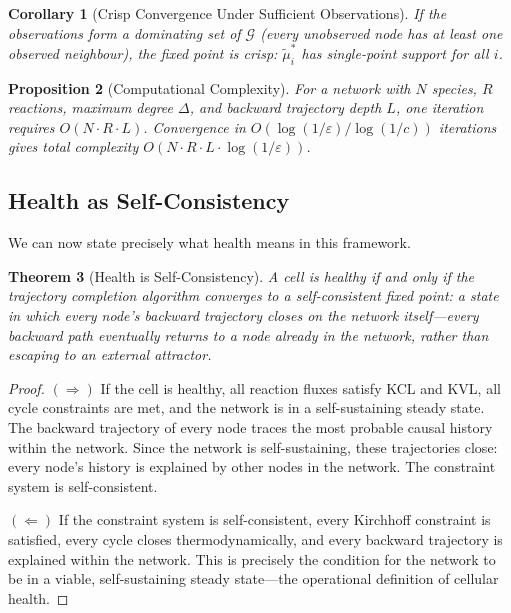 \documentclass[10pt,twocolumn,a4paper]{article}
\theoremstyle{plain}
\newtheorem{theorem}{Theorem}[section]
\newtheorem{proposition}[theorem]{Proposition}
\newtheorem{corollary}[theorem]{Corollary}
\theoremstyle{definition}
\theoremstyle{remark}
\newcommand{\circuit}{\mathcal{G}}
\begin{document}
\begin{corollary}[Crisp Convergence Under Sufficient Observations]
\label{cor:crisp}
If the observations form a dominating set of $\circuit$ (every unobserved node has at least one observed neighbour), the fixed point is crisp: $\widetilde{\mu}_i^*$ has single-point support for all $i$.
\end{corollary}

\begin{proposition}[Computational Complexity]
\label{prop:complexity}
For a network with $N$ species, $R$ reactions, maximum degree $\Delta$, and backward trajectory depth $L$, one iteration requires $O(N \cdot R \cdot L)$. Convergence in $O(\log(1/\varepsilon) / \log(1/c))$ iterations gives total complexity $O(N \cdot R \cdot L \cdot \log(1/\varepsilon))$.
\end{proposition}

\subsection{Health as Self-Consistency}

We can now state precisely what health means in this framework.

\begin{theorem}[Health is Self-Consistency]
\label{thm:health}
A cell is healthy if and only if the trajectory completion algorithm converges to a self-consistent fixed point: a state in which every node's backward trajectory closes on the network itself---every backward path eventually returns to a node already in the network, rather than escaping to an external attractor.
\end{theorem}

\begin{proof}
$(\Rightarrow)$ If the cell is healthy, all reaction fluxes satisfy KCL and KVL, all cycle constraints are met, and the network is in a self-sustaining steady state. The backward trajectory of every node traces the most probable causal history within the network. Since the network is self-sustaining, these trajectories close: every node's history is explained by other nodes in the network. The constraint system is self-consistent.

$(\Leftarrow)$ If the constraint system is self-consistent, every Kirchhoff constraint is satisfied, every cycle closes thermodynamically, and every backward trajectory is explained within the network. This is precisely the condition for the network to be in a viable, self-sustaining steady state---the operational definition of cellular health.
\end{proof}
\end{document}
